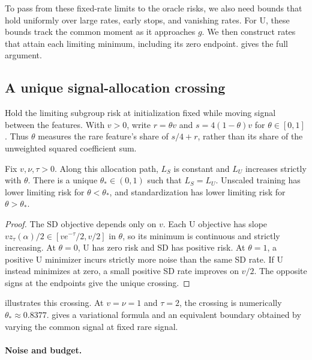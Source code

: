 \documentclass{alt2027}
\begin{document}
To pass from these fixed-rate limits to the oracle risks, we also need bounds
that hold uniformly over large rates, early stops, and vanishing rates. For U,
these bounds track the common moment as it approaches $g$. We then construct
rates that attain each limiting minimum, including its zero endpoint.
 gives the full argument.

\subsection{A unique signal-allocation crossing}

Hold the limiting subgroup risk at initialization fixed while moving signal
between the features. With $v > 0$, write $r = \theta v$ and
$s = 4(1 - \theta)v$ for $\theta \in[0,1]$. Thus $\theta$ measures the rare
feature's share of $s/4 + r$, rather than its share of the unweighted squared
coefficient sum.

\begin{corollary}
  \label{cor:oracle-allocation}
  Fix $v,\nu,\tau > 0$. Along this allocation path, $L_S$ is constant and $L_U$
  increases strictly with $\theta$. There is a unique $\theta_* \in (0,1)$ such
  that $L_S = L_U$. Unscaled training has lower limiting risk for
  $\theta < \theta_*$, and standardization has lower limiting risk for
  $\theta > \theta_*$.
\end{corollary}

\begin{proof}
  The SD objective depends only on $v$. Each U objective has slope
  $vz_\tau(\alpha)/2 \in[ve^{-\tau}/2,v/2]$ in $\theta$, so its minimum is
  continuous and strictly increasing. At $\theta = 0$, U has zero risk and SD
  has positive risk. At $\theta = 1$, a positive U minimizer incurs strictly
  more noise than the same SD rate. If U instead minimizes at zero, a small
  positive SD rate improves on $v/2$. The opposite signs at the endpoints give
  the unique crossing.
\end{proof}

 illustrates this crossing. At $v = \nu = 1$ and
$\tau = 2$, the crossing is numerically $\theta_* \approx 0.8377$.
 gives a variational formula and an equivalent
boundary obtained by varying the common signal at fixed rare signal.

\paragraph{Noise and budget.}
\end{document}
